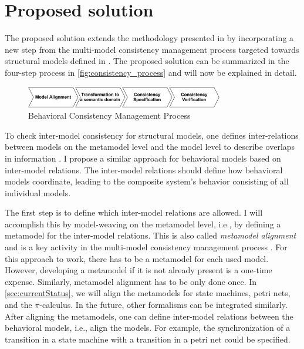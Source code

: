 \documentclass[conference]{IEEEtran}
\begin{document}
\section{Proposed solution}
The proposed solution extends the methodology presented in \cite{engelsMethodologySpecifyingAnalyzing2001} by incorporating a new step from the multi-model consistency management process targeted towards structural models defined in \cite{stunkelMultipleModelSynchronization2020}.
The proposed solution can be summarized in the four-step process in \autoref{fig:consistency_process} and will now  be explained in detail.

\begin{figure}[h]
    \centering
    \includegraphics[width=3.4in]{methodology}
    \caption{Behavioral Consistency Management Process}
    \label{fig:consistency_process}
\end{figure}

To check inter-model consistency for structural models, one defines inter-relations between models on the metamodel level and the model level to describe overlaps in information \cite{stunkelMultipleModelSynchronization2020}.
I propose a similar approach for behavioral models based on inter-model relations.
The inter-model relations should define how behavioral models coordinate, leading to the composite system's behavior consisting of all individual models.

The first step is to define which inter-model relations are allowed.
I will accomplish this by model-weaving on the metamodel level, i.e., by defining a metamodel for the inter-model relations.
This is also called \textit{metamodel alignment} and is a key activity in the multi-model consistency management process \cite{stunkelMultipleModelSynchronization2020}.
For this approach to work, there has to be a metamodel for each used model.
However, developing a metamodel if it is not already present is a one-time expense.
Similarly, metamodel alignment has to be only done once.
In \autoref{sec:currentStatus}, we will align the metamodels for state machines, petri nets, and the $\pi$-calculus.
In the future, other formalisms can be integrated similarly.
After aligning the metamodels, one can define inter-model relations between the behavioral models, i.e., align the models.
For example, the synchronization of a transition in a state machine with a transition in a petri net could be specified.
\end{document}
